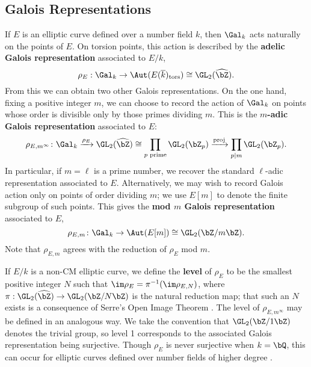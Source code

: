 \documentclass[11pt,reqno]{amsart}
\theoremstyle{plain}
\theoremstyle{definition}
\newcommand{\Q}{\bQ}
\newcommand{\Z}{\bZ}
\newcommand{\proj}{\operatorname{proj}}
\newcommand{\abedit}[1]{{\color{blue} #1}}
\begin{document}
\subsection{Galois Representations} If $E$ is an elliptic curve defined over a number field $k$, then $\Gal_k$ acts naturally on the points of $E$. On torsion points, this action is described by the \textbf{adelic Galois representation} associated to $E/k$,
\[
\rho_{E}: \Gal_k \rightarrow \Aut(E(\overline{k})_{\text{tors}}) \cong \GL_2(\widehat{\Z}).
\]
From this we can obtain two other Galois representations. On the one hand, fixing a positive integer $m$, we can choose to record the action of $\Gal_k$ on points \abedit{whose order is divisible only by those primes dividing $m$}. This is the \textbf{$m$-adic Galois representation} associated to $E$:
\[
\rho_{E,m^{\infty}}\colon \Gal_k \xrightarrow{\rho_E} \GL_2(\widehat{\Z}) \cong  \prod_{p \text{ prime}} \GL_2(\Z_{p}) \xrightarrow{\proj} \prod_{p \mid m} \GL_2(\Z_{p}).
\]
In particular, if $m=\ell$ is a prime number, we recover the standard $\ell$-adic representation associated to $E$. Alternatively, we may wish to record Galois action only on points of order dividing $m$; we use $E[m]$ to denote the finite subgroup of such points. This gives the \textbf{mod $m$ Galois representation} associated to $E$,
\[
\rho_{E,m}\colon \Gal_k \rightarrow \Aut(E[m]) \cong \GL_2(\Z/m\Z).
\]
Note that $\rho_{E,m}$ agrees with the reduction of $\rho_E$ mod $m$.

If $E/k$ is a non-CM elliptic curve, we define the \textbf{level} of $\rho_E$ to be the smallest positive integer $N$ such that $\im \rho_E=\pi^{-1}(\im \rho_{E,N})$, where $\pi:\GL_2(\widehat{\Z}) \rightarrow \GL_2(\Z/N\Z)$ is the natural reduction map; that such an $N$ exists is a consequence of Serre's Open Image Theorem \cite{serre72}. The level of $\rho_{E,m^{\infty}}$ may be defined in an analogous way. We take the convention that $\GL_2(\Z/1\Z)$ denotes the trivial group, so level 1 corresponds to the associated Galois representation being surjective. Though $\rho_E$ is never surjective when $k=\Q$, this can occur for elliptic curves defined over number fields of higher degree \cite[Theorem 1.2]{Greicius2010}.

\end{document}
